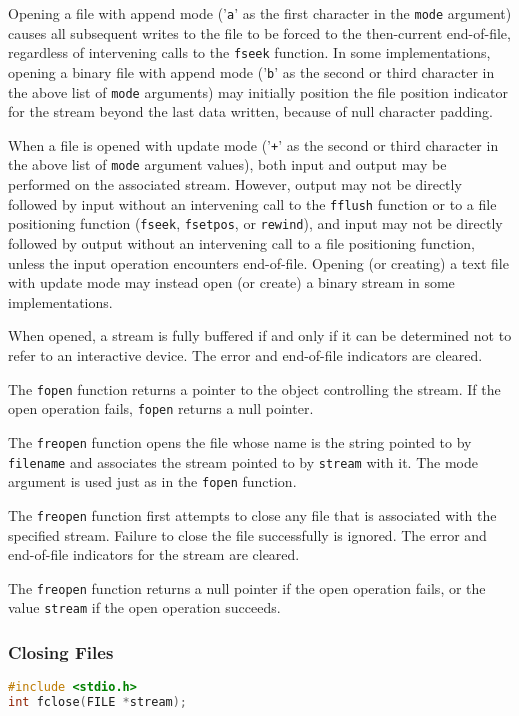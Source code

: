 Opening a file with append mode ('\texttt{a}' as the first character in the
\texttt{mode} argument) causes all subsequent writes to the file to be forced
to the then-current end-of-file, regardless of intervening calls to the
\texttt{fseek} function. In some implementations, opening a binary file with
append mode ('\texttt{b}' as the second or third character in the above list of
\texttt{mode} arguments) may initially position the file position indicator for
the stream beyond the last data written, because of null character padding.

When a file is opened with update mode ('\texttt{+}' as the second or third
character in the above list of \texttt{mode} argument values), both input and
output may be performed on the associated stream. However, output may not be
directly followed by input without an intervening call to the \texttt{fflush}
function or to a file positioning function (\texttt{fseek}, \texttt{fsetpos},
or \texttt{rewind}), and input may not be directly followed by output without
an intervening call to a file positioning function, unless the input operation
encounters end-of-file. Opening (or creating) a text file with update mode may
instead open (or create) a binary stream in some implementations.

When opened, a stream is fully buffered if and only if it can be determined not
to refer to an interactive device. The error and end-of-file indicators are
cleared.

The \texttt{fopen} function returns a pointer to the object controlling the
stream. If the open operation fails, \texttt{fopen} returns a null pointer.

The \texttt{freopen} function opens the file whose name is the string pointed
to by \texttt{filename} and associates the stream pointed to by \texttt{stream}
with it. The mode argument is used just as in the \texttt{fopen} function.

The \texttt{freopen} function first attempts to close any file that is
associated with the specified stream. Failure to close the file successfully is
ignored. The error and end-of-file indicators for the stream are cleared.

The \texttt{freopen} function returns a null pointer if the open operation
fails, or the value \texttt{stream} if the open operation succeeds. 

\subsubsection{Closing Files}
\lstset{basicstyle=\scriptsize, numbers=left, captionpos=b, tabsize=4}
\begin{lstlisting}[caption=Section \thesection listing \arabic{filecnt},language={C},
breaklines=true,xleftmargin=15pt,label=lst:section\thesection listing\arabic{filecnt}]
#include <stdio.h>
int fclose(FILE *stream);
\end{lstlisting}

